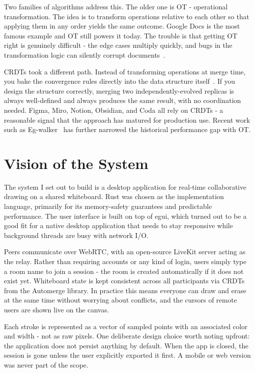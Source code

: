 \documentclass[a4paper,11pt,twoside]{report}
\theoremstyle{definition}
\begin{document}
Two families of algorithms address this. The older one is OT - operational transformation. 
The idea is to transform operations relative to each other so that applying them in any order 
yields the same outcome. Google Docs is the most famous example and OT still powers it today.
 The trouble is that getting OT right is genuinely difficult - the edge cases multiply quickly,
  and bugs in the transformation logic can silently corrupt documents~\cite{conclave}.

CRDTs took a different path. Instead of transforming operations at merge time, 
you bake the convergence rules directly into the data structure itself~\cite{inkandswitch-localfirst}. If you design 
the structure correctly, merging two independently-evolved replicas is always well-defined 
and always produces the same result, with no coordination needed. Figma, Miro, Notion, Obsidian, and Coda 
all rely on CRDTs - a reasonable signal that the approach has matured for production use. Recent
work such as Eg-walker~\cite{kleppmann-egwalker} has further narrowed the historical performance gap 
with OT.

\section{Vision of the System}


The system I set out to build is a desktop application for real-time collaborative drawing on a shared whiteboard.
Rust was chosen as the implementation language, primarily for its memory-safety guarantees and predictable performance.
The user interface is built on top of egui, which turned out to be a good fit for a native desktop application that
needs to stay responsive while background threads are busy with network I/O.

Peers communicate over WebRTC, with an open-source LiveKit server acting as the relay. Rather than requiring accounts
or any kind of login, users simply type a room name to join a session - the room is created automatically if it
does not exist yet. Whiteboard state is kept consistent across all participants via CRDTs from the Automerge library.
In practice this means everyone can draw and erase at the same time without worrying about conflicts, and the cursors
of remote users are shown live on the canvas.

Each stroke is represented as a vector of sampled points with an associated color and width - not as raw pixels.
One deliberate design choice worth noting upfront: the application does not persist anything by default.
When the app is closed, the session is gone unless the user explicitly exported it first.
A mobile or web version was never part of the scope.
\end{document}
